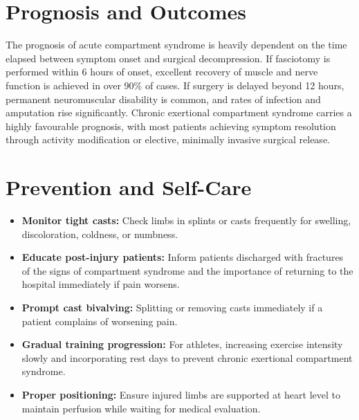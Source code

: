 \section*{Prognosis and Outcomes}
The prognosis of acute compartment syndrome is heavily dependent on the time elapsed between symptom onset and surgical decompression. If fasciotomy is performed within 6 hours of onset, excellent recovery of muscle and nerve function is achieved in over 90\% of cases. If surgery is delayed beyond 12 hours, permanent neuromuscular disability is common, and rates of infection and amputation rise significantly. Chronic exertional compartment syndrome carries a highly favourable prognosis, with most patients achieving symptom resolution through activity modification or elective, minimally invasive surgical release.

\section*{Prevention and Self-Care}
\begin{itemize}
    \item \textbf{Monitor tight casts:} Check limbs in splints or casts frequently for swelling, discoloration, coldness, or numbness.
    \item \textbf{Educate post-injury patients:} Inform patients discharged with fractures of the signs of compartment syndrome and the importance of returning to the hospital immediately if pain worsens.
    \item \textbf{Prompt cast bivalving:} Splitting or removing casts immediately if a patient complains of worsening pain.
    \item \textbf{Gradual training progression:} For athletes, increasing exercise intensity slowly and incorporating rest days to prevent chronic exertional compartment syndrome.
    \item \textbf{Proper positioning:} Ensure injured limbs are supported at heart level to maintain perfusion while waiting for medical evaluation.
\end{itemize}


